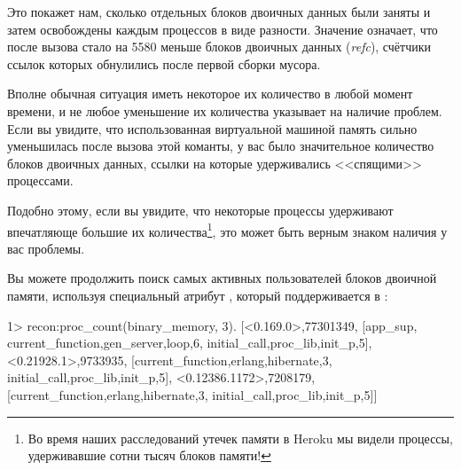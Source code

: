 Это покажет нам, сколько отдельных блоков двоичных данных были заняты и затем освобождены каждым процессов в виде разности. Значение  означает, что после вызова стало на 5580 меньше блоков двоичных данных (\emph{refc}), счётчики ссылок которых обнулились после первой сборки мусора.

Вполне обычная ситуация иметь некоторое их количество в любой момент времени, и не любое уменьшение их количества указывает на наличие проблем. Если вы увидите, что использованная виртуальной машиной память сильно уменьшилась после вызова этой команты, у вас было значительное количество блоков двоичных данных, ссылки на которые удерживались <<спящими>> процессами.

Подобно этому, если вы увидите, что некоторые процессы удерживают впечатляюще большие их количества\footnote{Во время наших расследований утечек памяти в Heroku мы видели процессы, удерживавшие сотни тысяч блоков памяти!}, это может быть верным знаком наличия у вас проблемы.

Вы можете продолжить поиск самых активных пользователей блоков двоичной памяти, используя специальный атрибут , который поддерживается в :

\begin{VerbatimEshell}
1> recon:proc_count(binary_memory, 3).
[{<0.169.0>,77301349,
  [app_sup,
   {current_function,{gen_server,loop,6}},
   {initial_call,{proc_lib,init_p,5}}]},
 {<0.21928.1>,9733935,
  [{current_function,{erlang,hibernate,3}},
   {initial_call,{proc_lib,init_p,5}}]},
 {<0.12386.1172>,7208179,
  [{current_function,{erlang,hibernate,3}},
   {initial_call,{proc_lib,init_p,5}}]}]
\end{VerbatimEshell}

